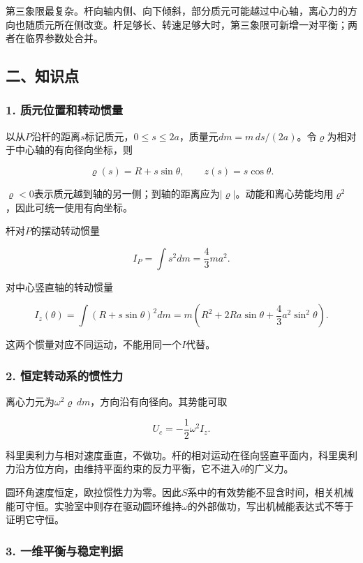 \documentclass[12pt,a4paper,fontset=fandol]{ctexart}
\begin{document}
第三象限最复杂。杆向轴内侧、向下倾斜，部分质元可能越过中心轴，离心力的方向也随质元所在侧改变。杆足够长、转速足够大时，第三象限可新增一对平衡；两者在临界参数处合并。

\subsection{二、知识点}\label{ux4e8cux77e5ux8bc6ux70b9-3}

\subsubsection{1.
质元位置和转动惯量}\label{ux8d28ux5143ux4f4dux7f6eux548cux8f6cux52a8ux60efux91cf}

以从\(P\)沿杆的距离\(s\)标记质元，\(0\leq s\leq2a\)，质量元\(dm=m\,ds/(2a)\)。令\(\varrho\)为相对于中心轴的有向径向坐标，则

\[
\varrho(s)=R+s\sin\theta,\qquad z(s)=s\cos\theta.
\]

\(\varrho<0\)表示质元越到轴的另一侧；到轴的距离应为\(|\varrho|\)。动能和离心势能均用\(\varrho^2\)，因此可统一使用有向坐标。

杆对\(P\)的摆动转动惯量

\[
I_P=\int s^2dm=\frac43ma^2.
\]

对中心竖直轴的转动惯量

\[
I_z(\theta)=\int(R+s\sin\theta)^2dm
=m\left(R^2+2Ra\sin\theta+\frac43a^2\sin^2\theta\right).
\]

这两个惯量对应不同运动，不能用同一个\(I\)代替。

\subsubsection{2.
恒定转动系的惯性力}\label{ux6052ux5b9aux8f6cux52a8ux7cfbux7684ux60efux6027ux529b}

离心力元为\(\omega^2\varrho\,dm\)，方向沿有向径向。其势能可取

\[
U_c=-\frac12\omega^2 I_z.
\]

科里奥利力与相对速度垂直，不做功。杆的相对运动在径向竖直平面内，科里奥利力沿方位方向，由维持平面约束的反力平衡，它不进入\(\theta\)的广义力。

圆环角速度恒定，欧拉惯性力为零。因此\(S\)系中的有效势能不显含时间，相关机械能可守恒。实验室中则存在驱动圆环维持\(\omega\)的外部做功，写出机械能表达式不等于证明它守恒。

\subsubsection{3.
一维平衡与稳定判据}\label{ux4e00ux7ef4ux5e73ux8861ux4e0eux7a33ux5b9aux5224ux636e}
\end{document}
